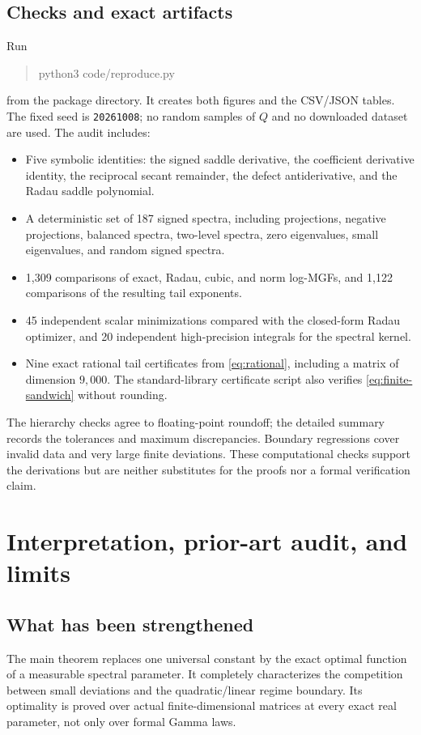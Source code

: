 \documentclass[11pt,letterpaper]{article}
\numberwithin{equation}{section}
\theoremstyle{definition}\newtheorem{definition}[theorem]{Definition}
\theoremstyle{remark}\newtheorem{remark}[theorem]{Remark}
\begin{document}
\subsection{Checks and exact artifacts}
Run
\begin{quote}\ttfamily
python3 code/reproduce.py
\end{quote}
from the package directory. It creates both figures and the CSV/JSON
tables. The fixed seed is \texttt{20261008}; no random samples of
$Q$ and no downloaded dataset are used. The audit includes:
\begin{itemize}
\item Five symbolic identities: the signed saddle derivative, the
coefficient derivative identity, the reciprocal secant remainder,
the defect antiderivative, and the Radau saddle polynomial.
\item A deterministic set of 187 signed spectra, including
projections, negative projections, balanced spectra, two-level
spectra, zero eigenvalues, small eigenvalues, and random signed spectra.
\item 1,309 comparisons of exact, Radau, cubic, and norm log-MGFs,
and 1,122 comparisons of the resulting tail exponents.
\item 45 independent scalar minimizations compared with the
closed-form Radau optimizer, and 20 independent high-precision
integrals for the spectral kernel.
\item Nine exact rational tail certificates from
\eqref{eq:rational}, including a matrix of dimension $9{,}000$.
The standard-library certificate script also verifies
\eqref{eq:finite-sandwich} without rounding.
\end{itemize}
The hierarchy checks agree to floating-point roundoff; the detailed
summary records the tolerances and maximum discrepancies. Boundary
regressions cover invalid data and very large finite deviations.
These computational checks support the derivations but are neither
substitutes for the proofs nor a formal verification claim.

\section{Interpretation, prior-art audit, and limits}\label{sec:scope}

\subsection{What has been strengthened}
The main theorem replaces one universal constant by the exact
optimal function of a measurable spectral parameter. It completely
characterizes the competition between small deviations and the
quadratic/linear regime boundary. Its optimality is proved over
actual finite-dimensional matrices at every exact real parameter,
not only over formal Gamma laws.
\end{document}
